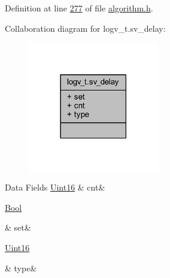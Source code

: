 Definition at line \hyperlink{a00021_source_l00277}{277} of file \hyperlink{a00021_source}{algorithm.\+h}.



Collaboration diagram for logv\+\_\+t.\+sv\+\_\+delay\+:\nopagebreak
\begin{figure}[H]
\begin{center}
\leavevmode
\includegraphics[width=162pt]{de/dfc/a00891}
\end{center}
\end{figure}
\begin{DoxyFields}{Data Fields}
\hypertarget{a00021_a2817f701d5e1a1181e657251363295fd}{\hyperlink{a00072_a59a9f6be4562c327cbfb4f7e8e18f08b}{Uint16}}\label{a00021_a2817f701d5e1a1181e657251363295fd}
&
cnt&
\\
\hline

\hypertarget{a00021_acdaeeeba9b4a4c5ebf042c0215a7bb0e}{\hyperlink{a00072_a253b248072cfc8bd812c69acd0046eed}{Bool}}\label{a00021_acdaeeeba9b4a4c5ebf042c0215a7bb0e}
&
set&
\\
\hline

\hypertarget{a00021_a599dcce2998a6b40b1e38e8c6006cb0a}{\hyperlink{a00072_a59a9f6be4562c327cbfb4f7e8e18f08b}{Uint16}}\label{a00021_a599dcce2998a6b40b1e38e8c6006cb0a}
&
type&
\\
\hline

\end{DoxyFields}


